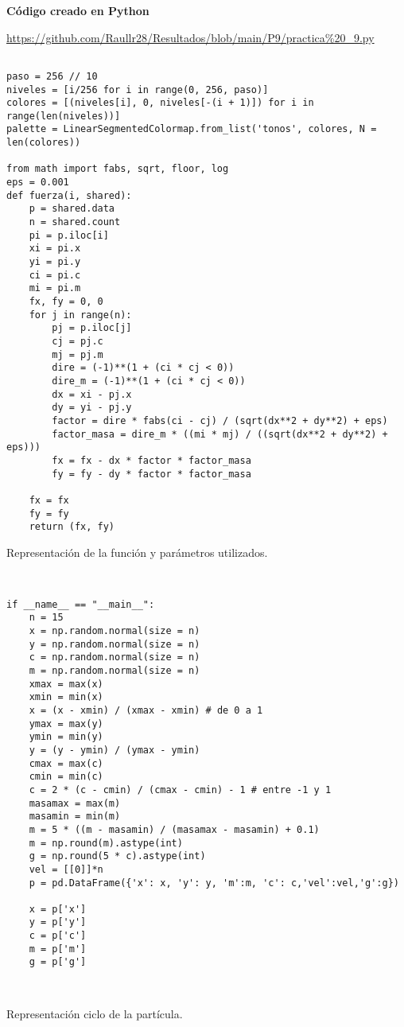 \documentclass{article}
\begin{document}
{\bf Código creado en Python}

\url{https://github.com/Raullr28/Resultados/blob/main/P9/practica%20_9.py}

\renewcommand{\listingscaption}{Código}

\begin{listing}[H]
\begin{verbatim}

paso = 256 // 10
niveles = [i/256 for i in range(0, 256, paso)]
colores = [(niveles[i], 0, niveles[-(i + 1)]) for i in range(len(niveles))]
palette = LinearSegmentedColormap.from_list('tonos', colores, N = len(colores))
 
from math import fabs, sqrt, floor, log
eps = 0.001
def fuerza(i, shared):
    p = shared.data
    n = shared.count
    pi = p.iloc[i]
    xi = pi.x
    yi = pi.y
    ci = pi.c
    mi = pi.m
    fx, fy = 0, 0
    for j in range(n):
        pj = p.iloc[j]
        cj = pj.c
        mj = pj.m
        dire = (-1)**(1 + (ci * cj < 0))
        dire_m = (-1)**(1 + (ci * cj < 0))
        dx = xi - pj.x
        dy = yi - pj.y
        factor = dire * fabs(ci - cj) / (sqrt(dx**2 + dy**2) + eps)
        factor_masa = dire_m * ((mi * mj) / ((sqrt(dx**2 + dy**2) + eps)))
        fx = fx - dx * factor * factor_masa
        fy = fy - dy * factor * factor_masa
    
    fx = fx
    fy = fy
    return (fx, fy)

  \end{verbatim}
  \label{lst:fibo}
  \caption{Representación de la función y parámetros utilizados.}
  
  
\end{listing}
\renewcommand{\listingscaption}{Código}
\begin{listing}[H]

\begin{verbatim}
 

if __name__ == "__main__":
    n = 15
    x = np.random.normal(size = n)
    y = np.random.normal(size = n)
    c = np.random.normal(size = n)
    m = np.random.normal(size = n)
    xmax = max(x)
    xmin = min(x)
    x = (x - xmin) / (xmax - xmin) # de 0 a 1
    ymax = max(y)
    ymin = min(y)
    y = (y - ymin) / (ymax - ymin) 
    cmax = max(c)
    cmin = min(c)
    c = 2 * (c - cmin) / (cmax - cmin) - 1 # entre -1 y 1
    masamax = max(m)
    masamin = min(m)
    m = 5 * ((m - masamin) / (masamax - masamin) + 0.1)
    m = np.round(m).astype(int)
    g = np.round(5 * c).astype(int)
    vel = [[0]]*n
    p = pd.DataFrame({'x': x, 'y': y, 'm':m, 'c': c,'vel':vel,'g':g})

    x = p['x']
    y = p['y']
    c = p['c']
    m = p['m']
    g = p['g']

   
  \end{verbatim}
  \label{lst:fibo}
  \caption{Representación ciclo de la partícula.}
\end{listing}
\end{document}
